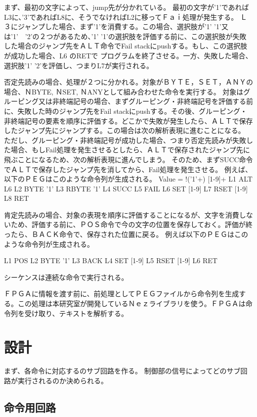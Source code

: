 \documentclass[12pt,oneside]{report}
\begin{document}
まず、最初の文字によって、jump先が分かれている。
最初の文字が'1'であればL3に、'3'であればL8に、そうでなければL2に移ってＦａｉ処理が発生する。
Ｌ３にジャンプした場合、まず'1'を消費する。この場合、選択肢が'1' '1'又は'1'　'2'の２つがあるため、'1' '1'の選択肢を評価する前に、この選択肢が失敗した場合のジャンプ先をＡＬＴ命令でFail stackにpushする。もし、この選択肢が成功した場合、L6 のRETで
プログラムを終了させる。一方、失敗した場合、選択肢'1' '2'を評価し、つまりL7が実行される。

否定先読みの場合、処理が２つに分かれる。対象がＢＹＴＥ，ＳＥＴ，ＡＮＹの場合、ＮBYTE, ＮSET, ＮANYとして組み合わせた命令を実行する。
対象はグルーピング又は非終端記号の場合、まずグルーピング・非終端記号を評価する前に、失敗した時のジャンプ先をFail stackにpushする。その後、グルーピング・非終端記号の要素を順序に評価する。どこかで失敗が発生したら、ＡＬＴで保存したジャンプ先にジャンプする。この場合は次の解析表現に進むことになる。
ただし、グルーピング・非終端記号が成功した場合、つまり否定先読みが失敗した場合、もしFail処理を発生させるとしたら、ＡＬＴで保存されたジャンプ先に飛ぶことになるため、次の解析表現に進んでしまう。
そのため、まずSUCC命令でＡＬＴで保存したジャンプ先を消してから、Fail処理を発生させる。
例えば、以下のＰＥＧはこのような命令列が生成される。
Value = !('1'+) [1-9]+
L1 ALT L6
L2 BYTE '1'
L3 RBYTE '1'
L4 SUCC
L5 FAIL
L6 SET [1-9]
L7 RSET [1-9]
L8 RET
 

肯定先読みの場合、対象の表現を順序に評価することになるが、文字を消費しないため、評価する前に、ＰＯＳ命令で今の文字の位置を保存しておく。評価が終ったら、ＢＡＣＫ命令で、保存された位置に戻る。
例えば以下のＰＥＧはこのような命令列が生成される。

L1 POS
L2 BYTE '1'
L3 BACK
L4 SET [1-9]
L5 RSET [1-9]
L6 RET

シーケンスは連続な命令で実行される。


ＦＰＧＡに情報を渡す前に、前処理としてＰＥＧファイルから命令列を生成する。この処理は本研究室が開発しているＮｅｚライブラリを使う。ＦＰＧＡは命令列を受け取り、テキストを解析する。


\chapter{設計}
\label{Design}
まず、各命令に対応するのサブ回路を作る。
制御部の信号によってどのサブ回路が実行されるのか決められる。

\section{命令用回路}
\end{document}
